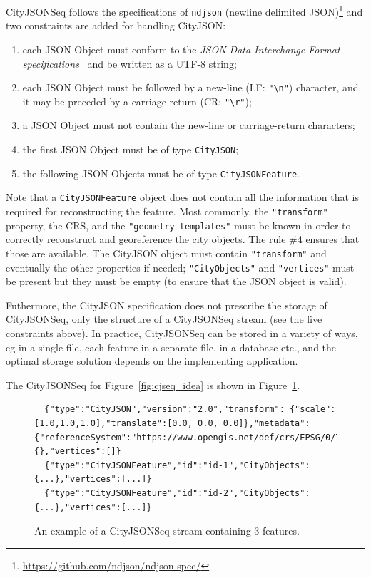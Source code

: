 \documentclass{isprs} %
\begin{document}
%

CityJSONSeq follows the specifications of \texttt{ndjson} (newline delimited JSON)\footnote{\url{https://github.com/ndjson/ndjson-spec/}} and two constraints are added for handling CityJSON\@:
\begin{enumerate}
  \item each JSON Object must conform to the \emph{JSON Data Interchange Format specifications}~\citep{IETF-JSON} and be written as a UTF-8 string;
  \item each JSON Object must be followed by a new-line (LF: \texttt{"\textbackslash n"}) character, and it may be preceded by a carriage-return (CR: \texttt{"\textbackslash r"});
  \item a JSON Object must not contain the new-line or carriage-return characters;
  \item the first JSON Object must be of type \texttt{CityJSON};
  \item the following JSON Objects must be of type \texttt{CityJSONFeature}.
\end{enumerate}

Note that a \texttt{CityJSONFeature} object does not contain all the information that is required for reconstructing the feature. 
Most commonly, the \texttt{"transform"} property, the CRS, and the \texttt{"geometry-templates"} must be known in order to correctly reconstruct and georeference the city objects. 
The rule \#4 ensures that those are available. 
The CityJSON object must contain \texttt{"transform"} and eventually the other properties if needed; \texttt{"CityObjects"} and \texttt{"vertices"} must be present but they must be empty (to ensure that the JSON object is valid).

Futhermore, the CityJSON specification does not prescribe the storage of CityJSONSeq, only the structure of a CityJSONSeq stream (see the five constraints above).
In practice, CityJSONSeq can be stored in a variety of ways, eg in a single file, each feature in a separate file, in a database etc., and the optimal storage solution depends on the implementing application.

%

The CityJSONSeq for Figure~\ref{fig:cjseq_idea} is shown in Figure~\ref{fig:stream}.
\begin{figure}
  \begin{lstlisting}
  {"type":"CityJSON","version":"2.0","transform": {"scale":[1.0,1.0,1.0],"translate":[0.0, 0.0, 0.0]},"metadata":{"referenceSystem":"https://www.opengis.net/def/crs/EPSG/0/7415"},"CityObjects":{},"vertices":[]}
  {"type":"CityJSONFeature","id":"id-1","CityObjects":{...},"vertices":[...]} 
  {"type":"CityJSONFeature","id":"id-2","CityObjects":{...},"vertices":[...]} 
  \end{lstlisting}
\caption{An example of a CityJSONSeq stream containing 3 features.}%
\label{fig:stream}
\end{figure}
\end{document}
